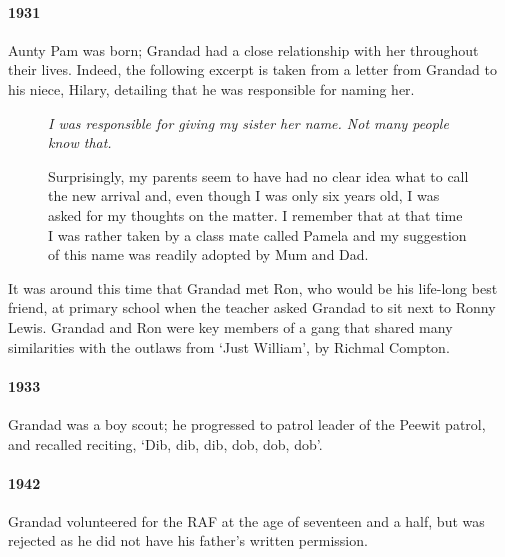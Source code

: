 \paragraph{1931} Aunty Pam was born; Grandad had a close relationship with her throughout their
lives. Indeed, the following excerpt is taken from a letter from Grandad to his niece, Hilary,
detailing that he was responsible for naming her.
\begin{figure}
	\itshape
	I was responsible for giving my sister her name. Not many people know that.

	Surprisingly, my parents seem to have had no clear idea what to call the new arrival and,
	even though I was only six years old, I was asked for my thoughts on the matter. I remember
	that at that time I was rather taken by a class mate called Pamela and my suggestion of this name
	was readily adopted by Mum and Dad.
\end{figure}

It was around this time that Grandad met Ron, who would be his life-long best friend, at primary
school when the teacher asked Grandad to sit next to Ronny Lewis. Grandad and Ron were key members
of a gang that shared many similarities with the outlaws from `Just William', by Richmal Compton.

\paragraph{1933} Grandad was a boy scout; he progressed to patrol leader of the Peewit
patrol, and recalled reciting, `Dib, dib, dib, dob, dob, dob'.

\paragraph{1942} Grandad volunteered for the RAF at the age of seventeen and a half, but
was rejected as he did not have his father's written permission.
